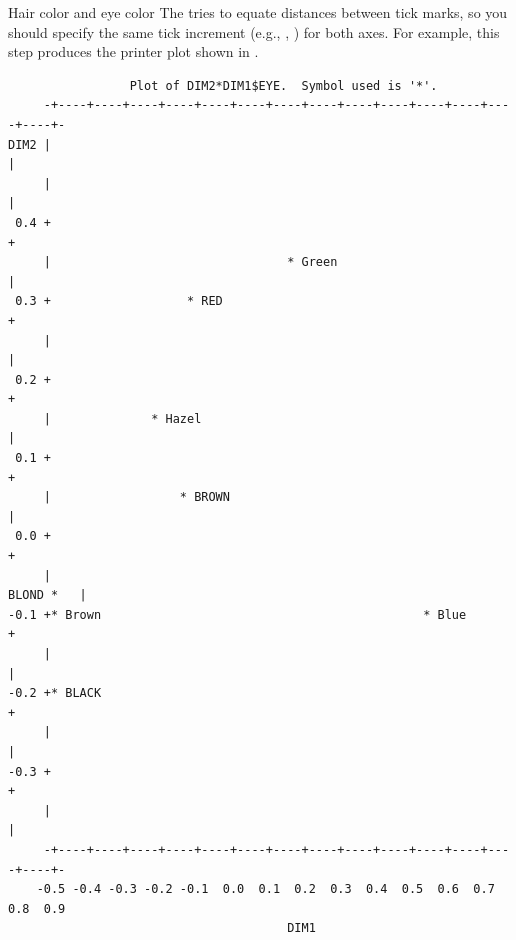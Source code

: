 \begin{Example}[haireye3]{Hair color and eye color}
The  tries to equate distances between tick marks,  so you should
specify the same tick increment (e.g., , ) for both axes.
For example, this  step produces the
printer plot shown in .


\begin{Output}[htb]
\caption{Labeled printer plot for the hair color, eye color \CA\ solution}\label{out:corresp3.3}
{\footnotesize
\begin{verbatim}
                 Plot of DIM2*DIM1$EYE.  Symbol used is '*'.
     -+----+----+----+----+----+----+----+----+----+----+----+----+----+----+-
DIM2 |                                                                       |
     |                                                                       |
 0.4 +                                                                       +
     |                                 * Green                               |
 0.3 +                   * RED                                               +
     |                                                                       |
 0.2 +                                                                       +
     |              * Hazel                                                  |
 0.1 +                                                                       +
     |                  * BROWN                                              |
 0.0 +                                                                       +
     |                                                             BLOND *   |
-0.1 +* Brown                                             * Blue             +
     |                                                                       |
-0.2 +* BLACK                                                                +
     |                                                                       |
-0.3 +                                                                       +
     |                                                                       |
     -+----+----+----+----+----+----+----+----+----+----+----+----+----+----+-
    -0.5 -0.4 -0.3 -0.2 -0.1  0.0  0.1  0.2  0.3  0.4  0.5  0.6  0.7  0.8  0.9
                                       DIM1
\end{verbatim}
}
\end{Output}


\end{Example}
